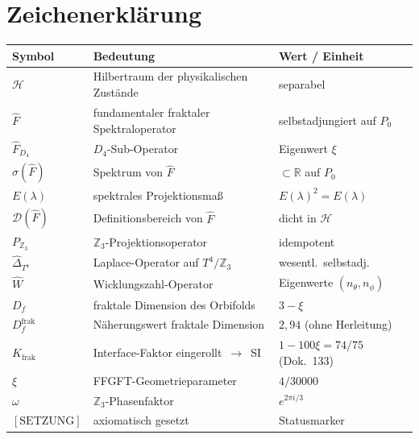 
\section*{Zeichenerklärung}

\begin{center}
\begin{tabular}{lll}
\toprule
Symbol & Bedeutung & Wert / Einheit \\
\midrule
$\mathcal{H}$ & Hilbertraum der physikalischen Zustände & separabel \\
$\hat{F}$ & fundamentaler fraktaler Spektraloperator & selbstadjungiert auf $P_0$ \\
$\hat{F}_{D_4}$ & $D_4$-Sub-Operator & Eigenwert $\xi$ \\
$\sigma(\hat{F})$ & Spektrum von $\hat{F}$ & $\subset \mathbb{R}$ auf $P_0$ \\
$E(\lambda)$ & spektrales Projektionsmaß & $E(\lambda)^2 = E(\lambda)$ \\
$\mathcal{D}(\hat{F})$ & Definitionsbereich von $\hat{F}$ & dicht in $\mathcal{H}$ \\
$P_{\mathbb{Z}_3}$ & $\mathbb{Z}_3$-Projektionsoperator & idempotent \\
$\hat{\Delta}_{T^4}$ & Laplace-Operator auf $T^4/\mathbb{Z}_3$ & wesentl.\ selbstadj. \\
$\hat{W}$ & Wicklungszahl-Operator & Eigenwerte $(n_\theta, n_\phi)$ \\
$D_f$ & fraktale Dimension des Orbifolds & $3 - \xi$ \\
$D_f^{\mathrm{frak}}$ & Näherungswert fraktale Dimension & $2{,}94$ (ohne Herleitung) \\
$K_{\mathrm{frak}}$ & Interface-Faktor eingerollt~$\to$~SI & $1-100\xi = 74/75$ (Dok.~133) \\
$\xi$ & FFGFT-Geometrieparameter & $4/30000$ \\
$\omega$ & $\mathbb{Z}_3$-Phasenfaktor & $e^{2\pi i/3}$ \\
$[\text{SETZUNG}]$ & axiomatisch gesetzt & Statusmarker \\
\bottomrule
\end{tabular}
\end{center}

